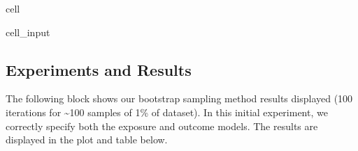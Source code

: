 \documentclass[letterpaper,10pt,english]{jupyterBook}
\begin{document}
\begin{sphinxuseclass}{cell}
\begin{sphinxVerbatimInput}
\begin{sphinxuseclass}{cell_input}
\begin{sphinxVerbatim}[commandchars=\\\{\}]
     
        \PYG{p}{[}\PYG{p}{]}\PYG{p}{[}\PYG{p}{]}     
        \PYG{p}{[}\PYG{p}{]}\PYG{p}{[}\PYG{p}{]}    
       
\end{sphinxVerbatim}

\end{sphinxuseclass}\end{sphinxVerbatimInput}

\end{sphinxuseclass}

\subsection{Experiments and Results}
\label{\detokenize{DR_Methods:experiments-and-results}}
\sphinxAtStartPar
The following  block shows our bootstrap sampling method results displayed (100 iterations for \textasciitilde{}100 samples of 1\% of dataset). In this initial experiment, we correctly specify both the exposure and outcome models. The results are displayed in the plot and table below.
\end{document}
